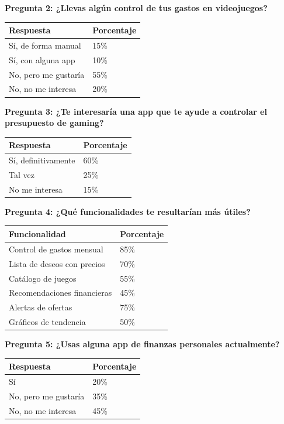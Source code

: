 \documentclass[
  spanish,
  11pt,
  paper=a4,
  ,captions=tableheading
]{scrartcl}
\begin{document}
\textbf{Pregunta 2: ¿Llevas algún control de tus gastos en videojuegos?}

\begin{longtable}[]{@{}ll@{}}
\toprule\noalign{}
Respuesta & Porcentaje \\
\midrule\noalign{}
\endhead
\bottomrule\noalign{}
\endlastfoot
Sí, de forma manual & 15\% \\
Sí, con alguna app & 10\% \\
No, pero me gustaría & 55\% \\
No, no me interesa & 20\% \\
\end{longtable}

\textbf{Pregunta 3: ¿Te interesaría una app que te ayude a controlar el
presupuesto de gaming?}

\begin{longtable}[]{@{}ll@{}}
\toprule\noalign{}
Respuesta & Porcentaje \\
\midrule\noalign{}
\endhead
\bottomrule\noalign{}
\endlastfoot
Sí, definitivamente & 60\% \\
Tal vez & 25\% \\
No me interesa & 15\% \\
\end{longtable}

\textbf{Pregunta 4: ¿Qué funcionalidades te resultarían más útiles?}

\begin{longtable}[]{@{}ll@{}}
\toprule\noalign{}
Funcionalidad & Porcentaje \\
\midrule\noalign{}
\endhead
\bottomrule\noalign{}
\endlastfoot
Control de gastos mensual & 85\% \\
Lista de deseos con precios & 70\% \\
Catálogo de juegos & 55\% \\
Recomendaciones financieras & 45\% \\
Alertas de ofertas & 75\% \\
Gráficos de tendencia & 50\% \\
\end{longtable}

\textbf{Pregunta 5: ¿Usas alguna app de finanzas personales
actualmente?}

\begin{longtable}[]{@{}ll@{}}
\toprule\noalign{}
Respuesta & Porcentaje \\
\midrule\noalign{}
\endhead
\bottomrule\noalign{}
\endlastfoot
Sí & 20\% \\
No, pero me gustaría & 35\% \\
No, no me interesa & 45\% \\
\end{longtable}
\end{document}
